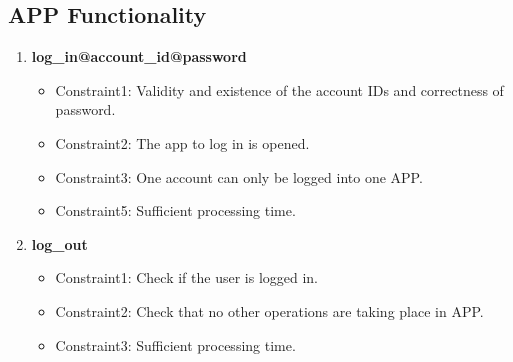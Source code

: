 \documentclass[12pt]{article}
\begin{document}
\subsection{APP Functionality}
\begin{enumerate}
    \item \textbf{log\_in@account\_id@password}
        \begin{itemize}
            \item Constraint1: Validity and existence of the account IDs and correctness of password.
            \item Constraint2: The app to log in is opened.
            \item Constraint3: One account can only be logged into one APP.
            \item Constraint5: Sufficient processing time.
        \end{itemize}
        
    \item \textbf{log\_out}
        \begin{itemize}
            \item Constraint1: Check if the user is logged in.
            \item Constraint2: Check that no other operations are taking place in APP.
             \item Constraint3: Sufficient processing time.
        \end{itemize}
        
\end{enumerate}
\end{document}
